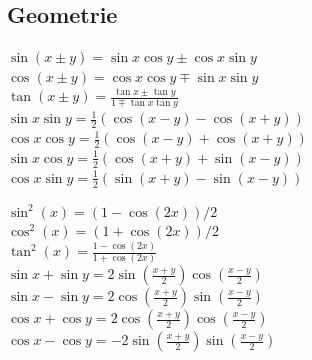 \documentclass[12pt,a4paper, twoside]{article}
\renewcommand{\=}[1]{\stackrel{#1}{=}}
\theoremstyle{definition}
\theoremstyle{remark}
\begin{document}
\subsection{Geometrie}

\begin{center}
\begin{minipage}[t]{.49\linewidth}
\vspace{0pt}

\noindent$\sin(x\pm y) = \sin x \cos y \pm \cos x \sin y$\\
$\cos(x \pm y) = \cos x \cos y \mp \sin x \sin y$\\
$\tan (x \pm y) = \frac{\tan x \pm \tan y}{1 \mp \tan x \tan y}$\\

\noindent$\sin x \sin y = \frac{1}{2} (\cos (x-y) - \cos (x+y))$\\
$\cos x \cos y = \frac{1}{2} (\cos (x-y) + \cos (x+y))$\\
$\sin x \cos y = \frac{1}{2} (\cos (x+y) + \sin (x-y))$\\
$\cos x \sin y = \frac{1}{2} (\sin (x+y) - \sin (x-y))$

\end{minipage}%
\begin{minipage}[t]{.49\linewidth}
\vspace{0pt}

\noindent$\sin^2 (x) = (1 - \cos (2x))/2$\\
$\cos^2 (x) = (1 + \cos (2x))/2$\\
$\tan^2 (x) = \frac{1 - \cos (2x)}{1 + \cos (2x)}$\\

\noindent$\sin x + \sin y = 2 \sin (\frac{x+y}{2}) \cos (\frac{x-y}{2})$\\
$\sin x - \sin y = 2 \cos (\frac{x+y}{2}) \sin (\frac{x-y}{2})$\\
$\cos x + \cos y = 2 \cos (\frac{x+y}{2}) \cos (\frac{x-y}{2})$\\
$\cos x - \cos y = - 2 \sin (\frac{x+y}{2}) \sin (\frac{x-y}{2})$

\end{minipage}
\end{center}
\end{document}
